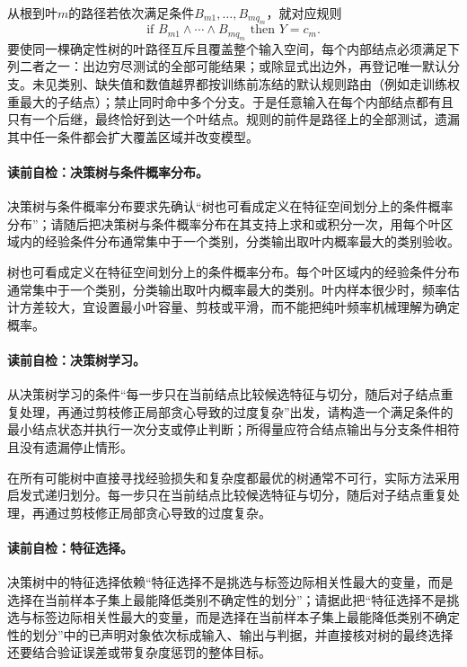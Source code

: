 从根到叶$m$的路径若依次满足条件$B_{m1},\ldots,B_{mq_m}$，就对应规则
\[
\text{if }B_{m1}\land\cdots\land B_{mq_m}\text{ then }Y=c_m.
\]
要使同一棵确定性树的叶路径互斥且覆盖整个输入空间，每个内部结点必须满足下列二者之一：出边穷尽测试的全部可能结果；或除显式出边外，再登记唯一默认分支。未见类别、缺失值和数值越界都按训练前冻结的默认规则路由（例如走训练权重最大的子结点）；禁止同时命中多个分支。于是任意输入在每个内部结点都有且只有一个后继，最终恰好到达一个叶结点。规则的前件是路径上的全部测试，遗漏其中任一条件都会扩大覆盖区域并改变模型。

\paragraph{读前自检：决策树与条件概率分布。}决策树与条件概率分布要求先确认“树也可看成定义在特征空间划分上的条件概率分布”；请随后把决策树与条件概率分布在其支持上求和或积分一次，用每个叶区域内的经验条件分布通常集中于一个类别，分类输出取叶内概率最大的类别验收。\par

树也可看成定义在特征空间划分上的条件概率分布。每个叶区域内的经验条件分布通常集中于一个类别，分类输出取叶内概率最大的类别。叶内样本很少时，频率估计方差较大，宜设置最小叶容量、剪枝或平滑，而不能把纯叶频率机械理解为确定概率。


\paragraph{读前自检：决策树学习。}从决策树学习的条件“每一步只在当前结点比较候选特征与切分，随后对子结点重复处理，再通过剪枝修正局部贪心导致的过度复杂”出发，请构造一个满足条件的最小结点状态并执行一次分支或停止判断；所得量应符合结点输出与分支条件相符且没有遗漏停止情形。\par

在所有可能树中直接寻找经验损失和复杂度都最优的树通常不可行，实际方法采用启发式递归划分。每一步只在当前结点比较候选特征与切分，随后对子结点重复处理，再通过剪枝修正局部贪心导致的过度复杂。

\paragraph{读前自检：特征选择。}决策树中的特征选择依赖“特征选择不是挑选与标签边际相关性最大的变量，而是选择在当前样本子集上最能降低类别不确定性的划分”；请据此把“特征选择不是挑选与标签边际相关性最大的变量，而是选择在当前样本子集上最能降低类别不确定性的划分”中的已声明对象依次标成输入、输出与判据，并直接核对树的最终选择还要结合验证误差或带复杂度惩罚的整体目标。\par

